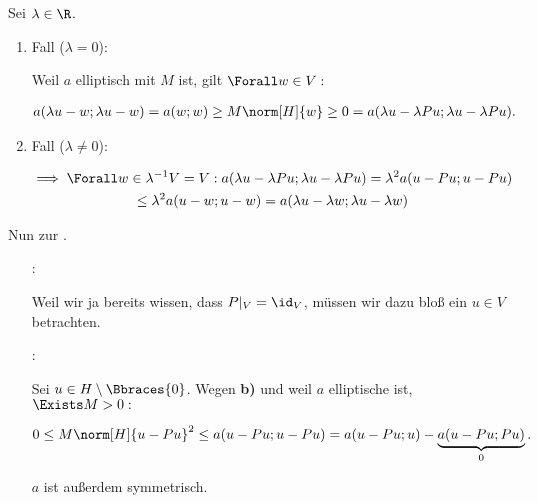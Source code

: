 \begin{solution}
\begin{enumerate}[label = \textbf{\alph*)}]
\begin{itemize}
    Sei $\lambda \in \R$.

    \begin{enumerate}[label = \arabic*.]

      \item Fall ($\lambda = 0$):
      
      Weil $a$ elliptisch mit $M$ ist, gilt $\Forall w \in V:$

      \begin{align*}
        a(\lambda u - w; \lambda u - w)
        =
        a(w; w)
        \geq
        M \norm[H]{w}
        \geq
        0 = a(\lambda u - \lambda Pu; \lambda u - \lambda Pu).
      \end{align*}

      \item Fall ($\lambda \neq 0$):

      \begin{multline*}
        \implies
        \Forall w \in \lambda^{-1} V = V:
        a(\lambda u - \lambda Pu;\lambda u - \lambda Pu)
        =
        \lambda^2 a(u - Pu;u - Pu) \\
        \leq
        \lambda^2 a(u - w; u - w)
        =
        a(\lambda u - \lambda w; \lambda u - \lambda w)
      \end{multline*}
    
    \end{enumerate}

\end{itemize}

  Nun zur .

  \begin{itemize}

    \item
    [\Quote{$\geq$}:]

    Weil wir ja bereits wissen, dass $P|_V = \id_V$, müssen wir dazu bloß ein $u \in V$ betrachten.

    \item
    [\Quote{$\leq$}:]

    Sei $u \in H \setminus \Bbraces{0}$.
    Wegen \textbf{b)} und weil $a$ elliptische ist, $\Exists M > 0:$

    \begin{align*}
      0 \leq M \norm[H]{u - Pu}^2
      \leq
      a(u - Pu; u - Pu)
      =
      a(u - Pu; u)
      -
      \underbrace{a(u - Pu; Pu)}_0.
    \end{align*}

    $a$ ist außerdem symmetrisch.


\end{itemize}
\end{enumerate}
\end{solution}
